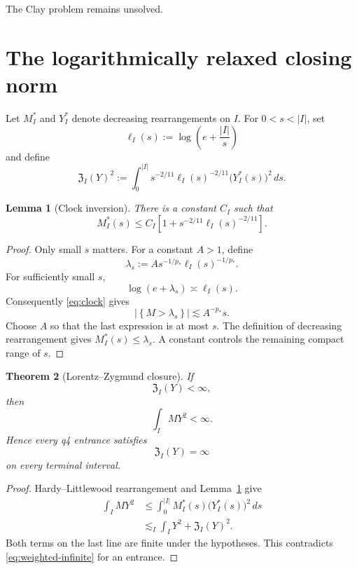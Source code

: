 \documentclass[11pt]{article}
\newtheorem{theorem}{Theorem}
\newtheorem{lemma}[theorem]{Lemma}
\theoremstyle{remark}
\newcommand{\set}[1]{\left\{#1\right\}}
\newcommand{\cZ}{\mathfrak Z}
\begin{document}
The Clay problem remains unsolved.

\section{The logarithmically relaxed closing norm}

Let \(M_I^*\) and \(Y_I^*\) denote decreasing rearrangements on \(I\).
For \(0<s<|I|\), set
\begin{equation}
\label{eq:ell}
 \ell_I(s):=\log\left(e+\frac{|I|}{s}\right)
\end{equation}
and define
\begin{equation}
\label{eq:Znorm}
 \boxed{
 \cZ_I(Y)^2
 :=
 \int_0^{|I|}
 s^{-2/11}\ell_I(s)^{-2/11}
 \bigl(Y_I^*(s)\bigr)^2\,ds.
 }
\end{equation}

\begin{lemma}[Clock inversion]
\label{lem:clock-inversion}
There is a constant \(C_I\) such that
\begin{equation}
\label{eq:Mstar}
 M_I^*(s)
 \leq
 C_I\left[
 1+s^{-2/11}\ell_I(s)^{-2/11}
 \right].
\end{equation}
\end{lemma}

\begin{proof}
Only small \(s\) matters.  For a constant \(A>1\), define
\[
 \lambda_s
 :=
 A s^{-1/p_*}\ell_I(s)^{-1/p_*}.
\]
For sufficiently small \(s\),
\[
 \log(e+\lambda_s)\asymp\ell_I(s).
\]
Consequently \eqref{eq:clock} gives
\[
 \left|\set{M>\lambda_s}\right|
 \lesssim A^{-p_*}s.
\]
Choose \(A\) so that the last expression is at most \(s\).  The
definition of decreasing rearrangement gives
\(M_I^*(s)\leq\lambda_s\).  A constant controls the remaining compact
range of \(s\).
\end{proof}

\begin{theorem}[Lorentz--Zygmund closure]
\label{thm:Zclosure}
If
\[
 \cZ_I(Y)<\infty,
\]
then
\[
 \int_I MY^2<\infty.
\]
Hence every q4 entrance satisfies
\begin{equation}
\label{eq:Zdivergence}
 \boxed{\cZ_I(Y)=\infty}
\end{equation}
on every terminal interval.
\end{theorem}

\begin{proof}
Hardy--Littlewood rearrangement and
Lemma~\ref{lem:clock-inversion} give
\begin{align*}
 \int_I MY^2
 &\leq
 \int_0^{|I|}
 M_I^*(s)\bigl(Y_I^*(s)\bigr)^2\,ds\\
 &\lesssim_I
 \int_IY^2+\cZ_I(Y)^2.
\end{align*}
Both terms on the last line are finite under the hypotheses.  This
contradicts \eqref{eq:weighted-infinite} for an entrance.
\end{proof}
\end{document}
